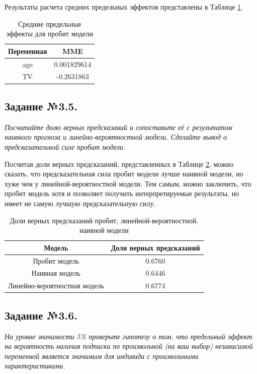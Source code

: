 \documentclass[a4paper,12pt]{article}
\begin{document}
	Результаты расчета средних предельных эффектов представлены в Таблице \ref{MEprobit}.
	
	
	\begin{table}[h]
		\caption{Средние предельные эффекты для пробит модели}
		\label{MEprobit}
		\centering
		\begin{tabular}{|c|c|}
			\hline
			Переменная &  MME  \\ 
			\hline
			age  &0.001829614 \\ 
			\hline
			TV &-0.2631863 \\ 			
			\hline
		\end{tabular}
	\end{table}
	
	\subsection{Задание №3.5.}
	\textit{
	Посчитайте долю верных предсказаний и сопоставьте её с результатом наивного прогноза и линейно-вероятностной модели. Сделайте вывод о предсказательной силе пробит модели.}
	
	\vspace{0.2cm}
	
	Посчитав доли верных предсказаний, представленных в Таблице \ref{accurmodels}, можно сказать, что предсказательная сила пробит модели лучше наивной модели, но хуже чем у линейной-вероятностной модели. Тем самым, можно заключить, что пробит модель хотя и позволяет получить интерпретируемые результаты, но имеет не самую лучшую предсказательную силу.
	
	\begin{table}[!h]
		\caption{Доли верных предсказаний пробит, линейной-вероятностной, наивной модели}
		\label{accurmodels}
		\centering
		\begin{tabular}{|c|c|}
			\hline
			Модель  &  Доля верных предсказаний  \\ 
			\hline
				Пробит модель& 0.6760\\
				\hline
				Наивная модель & 0.6446\\
				\hline
				Линейно-вероятностная модель &0.6774	\\		
			\hline
		\end{tabular}
	\end{table}
	
	\subsection{Задание №3.6.}
	\textit{
	На уровне значимости 5\% проверьте гипотезу о том, что предельный эффект на вероятность наличия подписки по произвольной (на ваш выбор) независимой переменной является значимым для индивида с произвольными характеристиками. }
	
\end{document}

